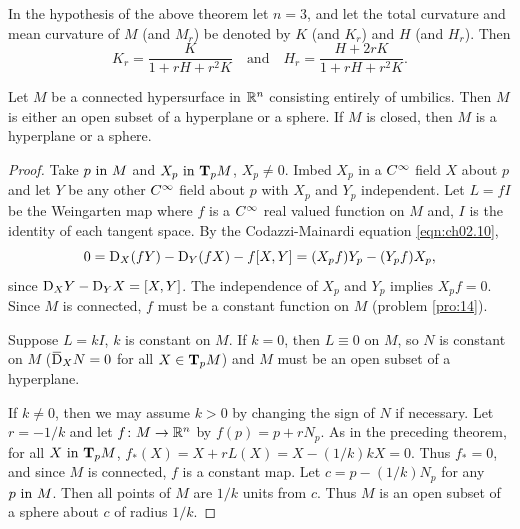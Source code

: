\documentclass[../main]{subfiles}
\begin{document}
\begin{corollary} \label{cor:ch2.6.2}
In the hypothesis of the above theorem let $n=3$, and let the total curvature and mean curvature of $M$ (and $M_r$) be denoted by $K$ (and $K_r$) and $H$ (and $H_r$). Then
\[ K_r = \frac{K}{1+rH+r^2K} \hspace{1em} \text{and} \hspace{1em} H_r = \frac{H+2rK}{1+rH+r^2K}. \]
\end{corollary}



\begin{theorem} \label{thm:ch2.6.3}
Let $M$ be a connected hypersurface in $\bR^n$ consisting entirely of umbilics. Then $M$ is either an open subset of a hyperplane or a sphere. If $M$ is closed, then $M$ is a hyperplane or a sphere.
\end{theorem}

\begin{proof}
Take $p \InText M$ and $X_p \InText \tangentspace{M}{p}$, $X_p \ne 0$. Imbed $X_p$ in a $\CInfty$ field $X$ about $p$ and let $Y$ be any other $\CInfty$ field about $p$ with $X_p$ and $Y_p$ independent. Let $L = fI$ be the Weingarten map where $f$ is a $\CInfty$ real valued function on $M$ and, $I$ is the identity of each tangent space. By the Codazzi-Mainardi equation \ref{eqn:ch02.10},
\[ 0 = \connection_X(fY) - \connection_Y(fX)-f[X, Y] = (X_pf)Y_p - (Y_pf)X_p, \]
since $\connection_XY - \connection_YX = [X, Y]$. The independence of $X_p$ and $Y_p$ implies $X_pf = 0$. Since $M$ is connected, $f$ must be a constant function on $M$ (problem \ref{pro:14}).

Suppose $L = kI$, $k$ is constant on $M$. If $k=0$, then $L\equiv 0$ on $M$, so $N$ is constant on $M$ ($\covariant_XN=0$ for all $X\in \tangentspace{M}{p}$) and $M$ must be an open subset of a hyperplane.

If $k\ne 0$, then we may assume $k>0$ by changing the sign of $N$ if necessary. Let $r= -1/k$ and let $f\colon M\functionMaps\bR^n$ by $f(p)=p+rN_p$. As in the preceding theorem, for all $X \InText \tangentspace{M}{p}$, $f_*(X) = X + rL(X) = X - (1/k)kX = 0$. Thus $f_*=0$, and since $M$ is connected, $f$ is a constant map. Let $c = p-(1/k)N_p$ for any $p \InText M$. Then all points of $M$ are $1/k$ units from $c$. Thus $M$ is an open subset of a sphere about $c$ of radius $1/k$. 
\end{proof}
\end{document}
